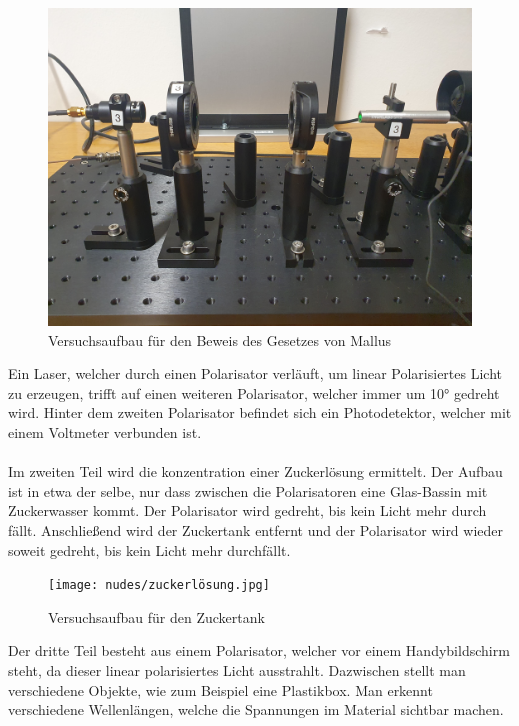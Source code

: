 \documentclass[12pt,a4paper,twoside]{article}
\begin{document}
    \begin{figure}[H]
        \centering
        \includegraphics[width=0.6\linewidth]{nudes/aufbau mallus.jpg}
        \caption{Versuchsaufbau für den Beweis des Gesetzes von Mallus}
        \label{fig:mallus aufbau}
    \end{figure}

\noindent
Ein Laser, welcher durch einen Polarisator verläuft, um linear Polarisiertes Licht zu erzeugen, trifft auf einen weiteren Polarisator, welcher immer um 10° gedreht wird. 
Hinter dem zweiten Polarisator befindet sich ein Photodetektor, welcher mit einem Voltmeter verbunden ist. 
\\
\\
Im zweiten Teil wird die konzentration einer Zuckerlösung ermittelt. Der Aufbau ist in etwa der selbe, nur dass zwischen die Polarisatoren eine Glas-Bassin mit Zuckerwasser kommt. 
Der Polarisator wird gedreht, bis kein Licht mehr durch fällt. Anschließend wird der Zuckertank entfernt und der Polarisator wird wieder soweit gedreht, bis kein Licht mehr durchfällt. 

\begin{figure}[H]
    \centering
    \texttt{[image: nudes/zuckerlösung.jpg]}
    \caption{Versuchsaufbau für den Zuckertank}
    \label{fig:zucker aufbau}
\end{figure}

\noindent
Der dritte Teil besteht aus einem Polarisator, welcher vor einem Handybildschirm steht, da dieser linear polarisiertes Licht ausstrahlt. 
Dazwischen stellt man verschiedene Objekte, wie zum Beispiel eine Plastikbox. Man erkennt verschiedene Wellenlängen, welche die Spannungen im Material sichtbar machen. 
\end{document}
